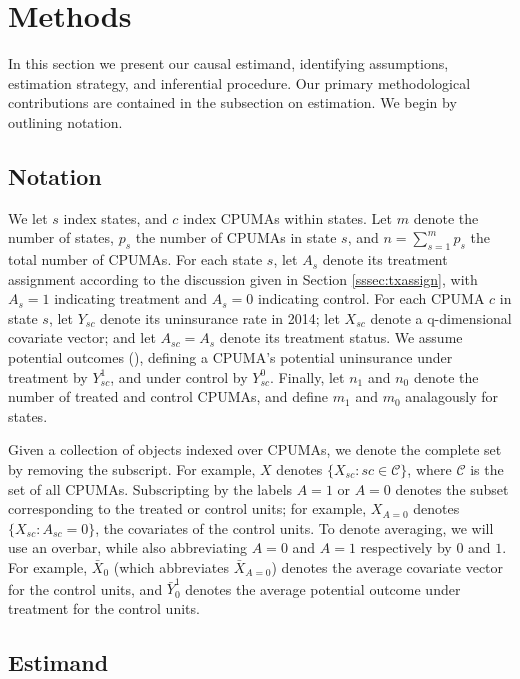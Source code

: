 \documentclass[aoas]{imsart}
\theoremstyle{plain}
\theoremstyle{remark}
\begin{document}
\section{Methods}\label{sec:methods}

In this section we present our causal estimand, identifying assumptions, estimation strategy, and inferential procedure. Our primary methodological contributions are contained in the subsection on estimation. We begin by outlining notation.

\subsection{Notation}
We let $s$ index states, and $c$ index CPUMAs within states. Let $m$ denote the number of states, $p_s$  the number of CPUMAs in state $s$, and $n = \sum_{s=1}^m p_s$ the total number of CPUMAs. For each state $s$, let $A_s$ denote its treatment assignment according to the discussion given in Section \ref{sssec:txassign}, with $A_s = 1$ indicating treatment and $A_s=0$ indicating control. For each CPUMA $c$ in state $s$, let $Y_{sc}$ denote its uninsurance rate in 2014; let $X_{sc}$ denote a q-dimensional covariate vector; and let $A_{sc} = A_{s}$ denote its treatment status. We assume potential outcomes (\cite{rubin2005causal}), defining a CPUMA's potential uninsurance under treatment by $Y^1_{sc}$, and under control by $Y^0_{sc}$. Finally, let $n_1$ and $n_0$ denote the number of treated and control CPUMAs, and define $m_1$ and $m_0$ analagously for states.

Given a collection of objects indexed over CPUMAs, we denote the complete set by removing the subscript. For example, $X$ denotes $\{X_{sc}: sc \in \mathcal{C}\}$, where $\mathcal{C}$ is the set of all CPUMAs. Subscripting by the labels $A=1$ or $A=0$ denotes the subset corresponding to the treated or control units; for example, $X_{A=0}$ denotes $\{X_{sc}: A_{sc}=0\}$, the covariates of the control units. To denote averaging, we will use an overbar, while also abbreviating $A=0$ and $A=1$ respectively by $0$ and $1$. For example, $\bar{X}_0$ (which abbreviates $\bar{X}_{A=0}$) denotes the average covariate vector for the control units, and $\bar{Y}_0^1$ denotes the average potential outcome under treatment for the control units.

\subsection{Estimand} \label{ssec:estimand}
\end{document}
